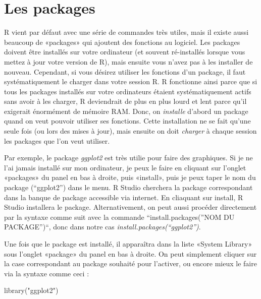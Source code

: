 \documentclass[
]{book}
\newenvironment{Shaded}{\begin{snugshade}}{\end{snugshade}}
\newcommand{\FunctionTok}[1]{\textcolor[rgb]{0.00,0.00,0.00}{#1}}
\newcommand{\NormalTok}[1]{#1}
\newcommand{\StringTok}[1]{\textcolor[rgb]{0.31,0.60,0.02}{#1}}
\begin{document}
\hypertarget{les-packages}{%
\section{Les packages}\label{les-packages}}

R vient par défaut avec une série de commandes très utiles, mais il existe aussi beaucoup de «packages» qui ajoutent des fonctions au logiciel. Les packages doivent être installés sur votre ordinateur (et souvent ré-installés lorsque vous mettez à jour votre version de R), mais ensuite vous n'avez pas à les installer de nouveau. Cependant, si vous désirez utiliser les fonctions d'un package, il faut systématiquement le charger dans votre session R. R fonctionne ainsi parce que si tous les packages installés sur votre ordinateurs étaient systématiquement actifs sans avoir à les charger, R deviendrait de plus en plus lourd et lent parce qu'il exigerait énormément de mémoire RAM. Donc, on \emph{installe} d'abord un package quand on veut pouvoir utiliser ses fonctions. Cette installation ne se fait qu'une seule fois (ou lors des mises à jour), mais ensuite on doit \emph{charger} à chaque session les packages que l'on veut utiliser.

Par exemple, le package \emph{ggplot2} est très utilie pour faire des graphiques. Si je ne l'ai jamais installé sur mon ordinateur, je peux le faire en cliquant sur l'onglet «packages» du panel en bas à droite, puis «install», puis je peux taper le nom du package (``ggplot2'') dans le menu. R Studio cherchera la package correspondant dans la banque de package accessible via internet. En cliaquant sur install, R Studio installera le package. Alternativement, on peut aussi procéder directement par la syntaxe comme suit avec la commande ``install.packages(''NOM DU PACKAGE'')``, donc dans notre cas \emph{install.packages(``ggplot2'')}.

Une fois que le package est installé, il apparaîtra dans la liste «System Library» sous l'onglet «package» du panel en bas à droite. On peut simplement cliquer sur la case correspondant au package souhaité pour l'activer, ou encore mieux le faire via la syntaxe comme ceci :

\begin{Shaded}
\begin{Highlighting}[]
\FunctionTok{library}\NormalTok{(}\StringTok{"ggplot2"}\NormalTok{)}
\end{Highlighting}
\end{Shaded}
\end{document}
